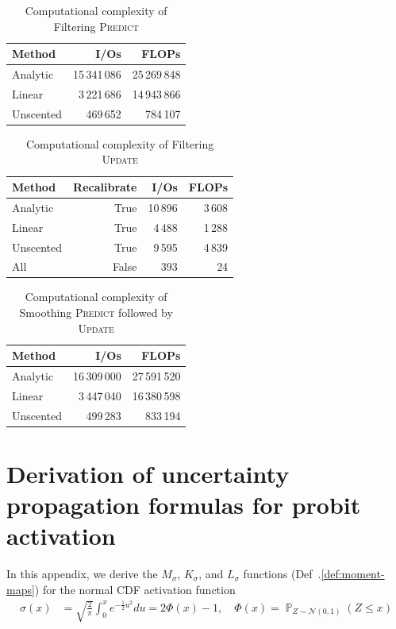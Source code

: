 \documentclass[oneside, article]{memoir}
\DeclareMathOperator{\probability}{\mathbb{P}}
\begin{document}
\begin{table}
  \centering
  \begin{tabular}{lrr}
    \toprule
    Method & I/Os & FLOPs \\
    \midrule
    Analytic & 15\,341\,086 & 25\,269\,848 \\
    Linear & 3\,221\,686 & 14\,943\,866 \\
    Unscented & 469\,652 & 784\,107 \\
    \bottomrule
  \end{tabular}
  \caption{Computational complexity of Filtering \textsc{Predict}}
  \label{tab:complexity-predict}
\end{table}

\begin{table}
  \centering
  \begin{tabular}{lrrr}
    \toprule
    Method & Recalibrate \cite{jiang_new_2025} & I/Os & FLOPs \\
    \midrule
    Analytic & True & 10\,896 & 3\,608 \\
    Linear & True & 4\,488 & 1\,288 \\
    Unscented & True & 9\,595 & 4\,839 \\
    All & False & 393 & 24 \\
    \bottomrule
  \end{tabular}
  \caption{Computational complexity of Filtering \textsc{Update}}
  \label{tab:complexity-update}
\end{table}

\begin{table}
  \centering
  \begin{tabular}{lrr}
    \toprule
    Method & I/Os & FLOPs \\
    \midrule
    Analytic & 16\,309\,000 & 27\,591\,520 \\
    Linear & 3\,447\,040 & 16\,380\,598 \\
    Unscented & 499\,283 & 833\,194 \\
    \bottomrule
  \end{tabular}
  \caption{Computational complexity of Smoothing \textsc{Predict}
  followed by \textsc{Update}}
  \label{tab:complexity-smooth}
\end{table}

\chapter{Derivation of uncertainty propagation formulas for probit activation}
In this appendix, we derive the \(M_\sigma\), \(K_\sigma\), and
\(L_\sigma\) functions (Def~.\ref{def:moment-maps}) for the normal
CDF activation function
\begin{align}
  \sigma(x) &= \sqrt{\frac{2}{\pi}} \int_{0}^x e^{-\frac{1}{2} u^2}
  du = 2 \Phi(x) - 1, \quad \Phi(x) = \probability_{Z \sim \mathcal
  N(0, 1)}(Z \leq x)
  \label{eq:activation}
\end{align}
\end{document}
